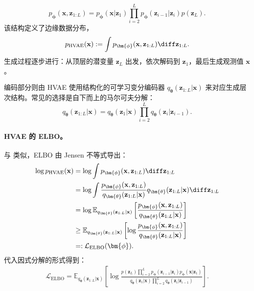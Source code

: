 \[
p_{\bm{\phi}}(\mathbf{x}, \mathbf{z}_{1:L}) = p_{\bm{\phi}}(\mathbf{x} | \mathbf{z}_1) \prod_{i=2}^{L} p_{\bm{\phi}}(\mathbf{z}_{i-1}|\mathbf{z}_i)   p(\mathbf{z}_L).
\]
该结构定义了边缘数据分布，
\[
p_{\text{HVAE}}(\mathbf{x}) := \int p_{\bm{\phi}}(\mathbf{x}, \mathbf{z}_{1:L}) \diff \mathbf{z}_{1:L}.
\]
 生成过程逐步进行：从顶层的潜变量 $ \mathbf{z}_L $ 出发，依次解码到 $ \mathbf{z}_1 $，最后生成观测值 $ \mathbf{x} $。

编码部分则由 HVAE 使用结构化的可学习变分编码器 $ q_{\bm{\theta}}(\mathbf{z}_{1:L}|\mathbf{x}) $ 来对应生成层次结构。常见的选择是自下而上的马尔可夫分解：
\[
q_{\bm{\theta}}(\mathbf{z}_{1:L} | \mathbf{x}) = q_{\bm{\theta}}(\mathbf{z}_1 | \mathbf{x}) \prod_{i=2}^{L} q_{\bm{\theta}}(\mathbf{z}_i | \mathbf{z}_{i-1}).
\]

\paragraph{HVAE 的 ELBO。}
与  类似，ELBO 由 Jensen 不等式导出：
\begin{align}\label{eq:hvae-elbo}
\begin{aligned}
    \log p_{\text{HVAE}}(\mathbf{x})
&= \log \int p_{\bm{\phi}}(\mathbf{x}, \mathbf{z}_{1:L}) \diff \mathbf{z}_{1:L} \\
&= \log \int \frac{p_{\bm{\phi}}(\mathbf{x}, \mathbf{z}_{1:L})}{q_{\bm{\theta}}(\mathbf{z}_{1:L}|\mathbf{x})}   q_{\bm{\theta}}(\mathbf{z}_{1:L}|\mathbf{x}) \diff \mathbf{z}_{1:L} \\
&= \log \mathbb{E}_{q_{\bm{\theta}}(\mathbf{z}_{1:L}|\mathbf{x})} \left[ \frac{p_{\bm{\phi}}(\mathbf{x}, \mathbf{z}_{1:L})}{q_{\bm{\theta}}(\mathbf{z}_{1:L}|\mathbf{x})} \right] \\
&\geq \mathbb{E}_{q_{\bm{\theta}}(\mathbf{z}_{1:L}|\mathbf{x})} \left[ \log \frac{p_{\bm{\phi}}(\mathbf{x}, \mathbf{z}_{1:L})}{q_{\bm{\theta}}(\mathbf{z}_{1:L}|\mathbf{x})} \right]\\
&=:\mathcal{L}_{\text{ELBO}}(\bm{\phi}).
\end{aligned}
\end{align}
代入因式分解的形式得到：
\begin{align*}
\mathcal{L}_{\text{ELBO}}
= \mathbb{E}_{q_{\bm{\theta}}(\mathbf{z}_{1:L}|\mathbf{x})} \left[
\log \frac{
p(\mathbf{z}_L) \prod_{i=2}^{L} p_{\bm{\phi}}(\mathbf{z}_{i-1} | \mathbf{z}_i)   p_{\bm{\phi}}(\mathbf{x} | \mathbf{z}_1)
}{
q_{\bm{\theta}}(\mathbf{z}_1|\mathbf{x}) \prod_{i=2}^{L} q_{\bm{\theta}}(\mathbf{z}_i|\mathbf{z}_{i-1})
}
\right].
\end{align*}

